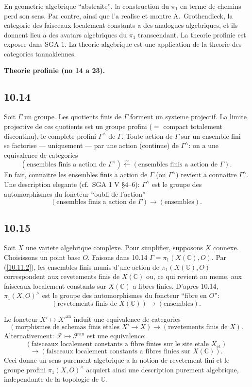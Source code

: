 \documentclass[12pt,a4paper]{article}
\theoremstyle{plain}
\theoremstyle{definition}
\theoremstyle{remark}
\newcommand{\C}{\mathbb{C}}
\begin{document}
En geometrie algebrique ``abstraite'', la construction du $\pi_1$ en terme de chemins perd son sens. Par contre, ainsi que l'a realise et montre A.~Grothendieck, la categorie des faisceaux localement constants a des analogues algebriques, et ils donnent lieu a des avatars algebriques du $\pi_1$ transcendant. La theorie profinie est exposee dans SGA 1. La theorie algebrique est une application de la theorie des categories tannakiennes.


\textbf{Theorie profinie (no 14 a 23).}

\subsection*{10.14}

Soit $\Gamma$ un groupe. Les quotients finis de $\Gamma$ forment un systeme projectif. La limite projective de ces quotients est un groupe profini ($=$ compact totalement discontinu), le complete profini $\Gamma^\wedge$ de $\Gamma$. Toute action de $\Gamma$ sur un ensemble fini se factorise --- uniquement --- par une action (continue) de $\Gamma^\wedge$: on a une equivalence de categories
$$(\text{ensembles finis a action de } \Gamma^\wedge) \xleftarrow{\sim} (\text{ensembles finis a action de } \Gamma).$$
En fait, connaitre les ensembles finis a action de $\Gamma$ (ou $\Gamma^\wedge$) revient a connaitre $\Gamma^\wedge$. Une description elegante (cf.~SGA 1 V \S 4--6): $\Gamma^\wedge$ est le groupe des automorphismes du foncteur ``oubli de l'action''
$$(\text{ensembles finis a action de } \Gamma) \longrightarrow (\text{ensembles}).$$

\subsection*{10.15}

Soit $X$ une variete algebrique complexe. Pour simplifier, supposons $X$ connexe. Choisissons un point base $O$. Faisons dans 10.14 $\Gamma = \pi_1(X(\C), O)$. Par (\ref{10.11.2}), les ensembles finis munis d'une action de $\pi_1(X(\C), O)$ correspondent aux revetements finis de $X(\C)$ ou, ce qui revient au meme, aux faisceaux localement constants sur $X(\C)$ a fibres finies. D'apres 10.14, $\pi_1(X, O)^\wedge$ est le groupe des automorphismes du foncteur ``fibre en $O$'':
$$(\text{revetements finis de } X(\C)) \longrightarrow (\text{ensembles}).$$

Le foncteur $X' \mapsto X'^{\mathrm{an}}$ induit une equivalence de categories
$$(\text{morphismes de schemas finis etales } X' \to X) \to (\text{revetements finis de } X).$$
Alternativement: $\mathcal{F} \mapsto \mathcal{F}^{\mathrm{an}}$ est une equivalence:
$$(\text{faisceaux localement constants a fibre finies sur le site etale } X_{\text{et}})$$
$$\to (\text{faisceaux localement constants a fibres finies sur } X(\C)).$$
Ceci donne un sens purement algebrique a la notion de revetement fini et le groupe profini $\pi_1(X, O)^\wedge$ acquiert ainsi une description purement algebrique, independante de la topologie de $\C$.
\end{document}
